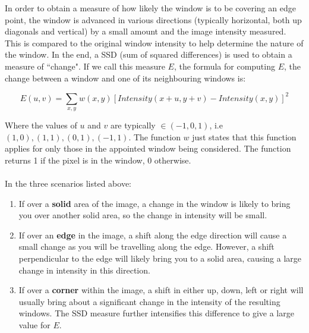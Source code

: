\documentclass[11pt]{article}
\begin{document}
In order to obtain a measure of how likely the window is to be covering
an edge point, the window is advanced in various directions (typically
horizontal, both up diagonals and vertical) by a small 
amount and the image intensity measured. This is compared to the original
window intensity to help determine the nature of the window. In the end, 
a SSD (sum of squared differences) is used to obtain a measure of ``change".
If we call this measure $E$, the formula for computing $E$, the
change between a window and one of its neighbouring windows is:

\begin{equation}
	E(u,v) = \sum_{x,y} w(x,y)[Intensity(x+u,y+v)-Intensity(x,y)]^2
\end{equation}

Where the values of $u$ and $v$ are typically $\in (-1,0,1)$, i.e
$(1,0), (1,1), (0,1), (-1,1)$. The function $w$ just states that
this function applies for only those in the appointed window being 
considered. The function returns 1 if the pixel is in the window, 0 
otherwise.\\
\\ 
In the three scenarios listed above:
\begin{enumerate}
	\item If over a \textbf{solid} area of the image, a change in the
			window is likely to bring you over another solid area, so
			the change in intensity will be small.
	\item If over an \textbf{edge} in the image, a shift along the edge
			direction will cause a small change as you will be travelling
			along the edge. However, a shift perpendicular to the edge will
			likely bring you to a solid area, causing a large change in 
			intensity in this direction.
	\item If over a \textbf{corner} within the image, a shift in either 
			up, down, left or right will usually bring about a significant
			change in the intensity of the resulting windows. The SSD measure
			further intensifies this difference to give a large value for $E$.
\end{enumerate}
\end{document}
